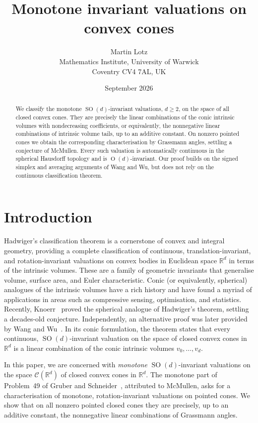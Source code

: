 \documentclass[11pt]{article}
\title{Monotone invariant valuations on convex cones}
\author{Martin Lotz\\[0.5ex]
  {\small Mathematics Institute, University of Warwick}\\
  {\small Coventry CV4 7AL, UK}}
\date{September 2026}
\newcommand{\R}{\mathbb{R}}
\newcommand{\CC}{\mathcal{C}}
\newcommand{\SOn}[1]{\operatorname{SO}(#1)}
\newcommand{\On}[1]{\operatorname{O}(#1)}
\theoremstyle{plain}
\theoremstyle{definition}
\begin{document}
\maketitle

\begin{abstract}
We classify the monotone $\SOn d$-invariant valuations, $d\ge2$, on
the space of all closed convex cones.  They are precisely the linear combinations
of the conic intrinsic volumes with nondecreasing coefficients, or equivalently, the
nonnegative linear combinations of
intrinsic volume tails, up to an additive constant.  On nonzero pointed
cones we obtain the corresponding characterisation by Grassmann angles,
settling a conjecture of McMullen.
Every such valuation is automatically continuous in the spherical Hausdorff
topology and is $\On d$-invariant.  Our proof builds on
the signed simplex and averaging arguments of Wang and Wu, but does
not rely on the continuous classification theorem.
\end{abstract}

\section{Introduction}\label{sec:introduction}
Hadwiger's classification theorem is a cornerstone of convex and integral geometry, providing a complete classification of continuous, translation-invariant, and rotation-invariant valuations on convex bodies in Euclidean space $\R^d$ in terms of the intrinsic volumes. These are a family of geometric invariants that generalise volume, surface area, and Euler characteristic.
Conic (or equivalently, spherical) analogues of the intrinsic volumes have a rich history and have found a myriad of applications in areas such as compressive sensing, optimisation, and statistics.
Recently, Knoerr~\cite[Theorem~A]{Knoerr:Spherical-Hadwiger} proved
the spherical analogue of Hadwiger's theorem, settling a decades-old conjecture. Independently, an alternative proof was later provided by Wang and Wu~\cite{WangWu:Spherical-Hadwiger}.
In its conic formulation, the theorem states that every continuous,
$\SOn d$-invariant valuation on the space of closed convex cones in $\R^d$
is a linear combination of the conic intrinsic volumes $v_0,\ldots,v_d$.

In this paper, we are concerned with \emph{monotone} $\SOn d$-invariant valuations on the space $\CC(\R^d)$ of closed convex cones in $\R^d$.
The monotone part of Problem~49 of Gruber and Schneider~\cite{Gruber1979},
attributed to McMullen, asks for a characterisation of monotone,
rotation-invariant valuations on pointed cones.  We show that on all
nonzero pointed closed cones they are precisely, up to an additive
constant, the nonnegative linear combinations of Grassmann angles.
\end{document}
